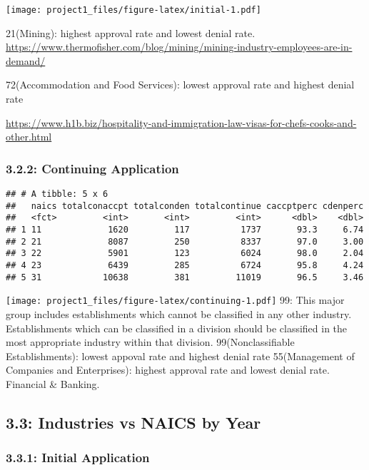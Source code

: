 \documentclass[]{article}
\begin{document}
\texttt{[image: project1\_files/figure-latex/initial-1.pdf]}

21(Mining): highest approval rate and lowest denial rate.
\url{https://www.thermofisher.com/blog/mining/mining-industry-employees-are-in-demand/}

72(Accommodation and Food Services): lowest approval rate and highest
denial rate

\url{https://www.h1b.biz/hospitality-and-immigration-law-visas-for-chefs-cooks-and-other.html}

\hypertarget{continuing-application}{%
\subsubsection{3.2.2: Continuing
Application}\label{continuing-application}}

\begin{verbatim}
## # A tibble: 5 x 6
##   naics totalconaccpt totalconden totalcontinue caccptperc cdenperc
##   <fct>         <int>       <int>         <int>      <dbl>    <dbl>
## 1 11             1620         117          1737       93.3     6.74
## 2 21             8087         250          8337       97.0     3.00
## 3 22             5901         123          6024       98.0     2.04
## 4 23             6439         285          6724       95.8     4.24
## 5 31            10638         381         11019       96.5     3.46
\end{verbatim}

\texttt{[image: project1\_files/figure-latex/continuing-1.pdf]} 99: This
major group includes establishments which cannot be classified in any
other industry. Establishments which can be classified in a division
should be classified in the most appropriate industry within that
division. 99(Nonclassifiable Establishments): lowest appoval rate and
highest denial rate 55(Management of Companies and Enterprises): highest
approval rate and lowest denial rate. Financial \& Banking.

\hypertarget{industries-vs-naics-by-year}{%
\subsection{3.3: Industries vs NAICS by
Year}\label{industries-vs-naics-by-year}}

\hypertarget{initial-application-1}{%
\subsubsection{3.3.1: Initial Application}\label{initial-application-1}}
\end{document}
